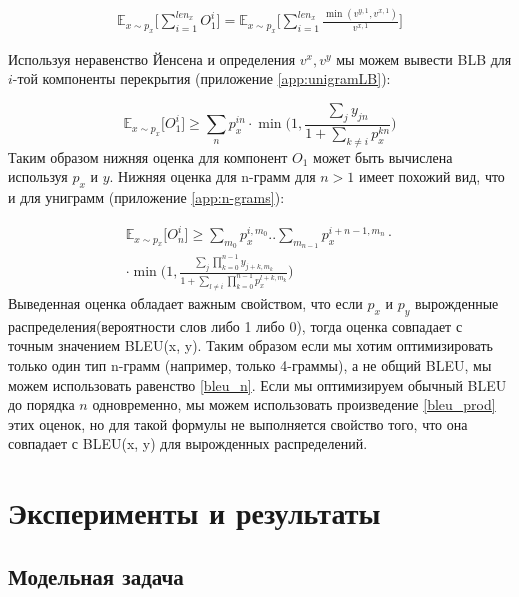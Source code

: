 \documentclass[14pt, a4paper]{extarticle}
\begin{document}
\begin{equation}
\begin{split}
\mathbb{E}_{x\sim p_x} \lbrack \sum_{i=1}^{len_x}{O_1^i} \rbrack =
\mathbb{E}_{x\sim p_x} \Big \lbrack \sum_{i=1}^{len_x} \frac{\min(v^{y, 1}, v^{x,1})}{v^{x, 1}} \Big \rbrack
\label{bleu_1}
\end{split}
\end{equation}

Используя неравенство Йенсена и определения $v^x, v^y$ мы можем вывести BLB для $i$-той компоненты перекрытия (приложение \ref{app:unigramLB}):

\begin{equation}
  \mathbb{E}_{x\sim p_x} \lbrack O_1^i \rbrack \geq \sum_n p_x^{in} \cdot \min \big(1, \frac{\sum_j y_{jn}}{1+\sum_{k\neq i} p_x^{kn}}\big)
\end{equation}
Таким образом нижняя оценка для компонент $O_1$ может быть вычислена используя $p_x$ и $y$. Нижняя оценка для n-грамм для $n>1$ имеет похожий вид, что и для униграмм (приложение \ref{app:n-grams}):

\begin{equation}
\begin{split}
  \label{bleu_n}
  \mathbb{E}_{x\sim p_x} \big[O_n^i \big] \geq   \sum_{m_0} p_x^{i,m_0} .. \sum_{m_{n-1}} p_x^{i+n-1,m_n} \cdot \\
 \cdot \min \big(1, \frac{\sum_j \prod_{k=0}^{n-1} y_{j + k, m_k}}{1 + \sum_{l \ne i} \prod_{k=0}^{n-1} p_x^{l+k,m_k}} \big)
\end{split}
\end{equation}
Выведенная оценка обладает важным свойством, что если $p_x$ и $p_y$ вырожденные распределения(вероятности слов либо 1 либо 0), тогда оценка совпадает с точным значением BLEU(x, y). Таким образом если мы хотим оптимизировать только один тип n-грамм (например, только 4-граммы), а не общий BLEU, мы можем использовать равенство \ref{bleu_n}.
Если мы оптимизируем обычный BLEU до порядка $n$ одновременно, мы можем использовать произведение \ref{bleu_prod} этих оценок, но для такой формулы не выполняется свойство того, что она совпадает с BLEU(x, y) для вырожденных распределений.

\section{Эксперименты и результаты}
\subsection{Модельная задача}
\end{document}
